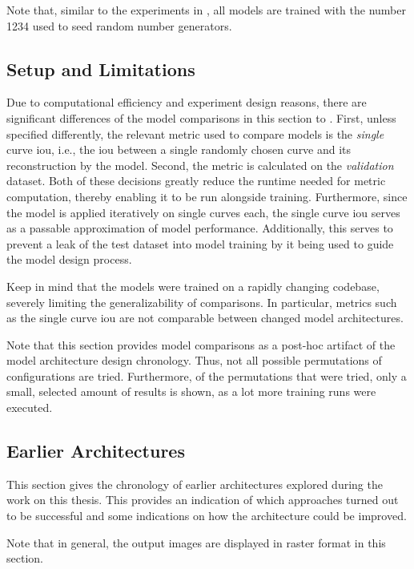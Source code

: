 Note that, similar to the experiments in , all models are trained with the number 1234 used to seed random number generators.

\subsection{Setup and Limitations}
\label{subsec:ablation.limitation}

Due to computational efficiency and experiment design reasons, there are significant differences of the model comparisons in this section to . First, unless specified differently, the relevant metric used to compare models is the \emph{single} curve \gls{iou}, i.e., the \gls{iou} between a single randomly chosen curve and its reconstruction by the model. Second, the metric is calculated on the \textit{validation} dataset. Both of these decisions greatly reduce the runtime needed for metric computation, thereby enabling it to be run alongside training. Furthermore, since the model is applied iteratively on single curves each, the single curve \gls{iou} serves as a passable approximation of model performance. Additionally, this serves to prevent a leak of the test dataset into model training by it being used to guide the model design process.

Keep in mind that the models were trained on a rapidly changing codebase, severely limiting the generalizability of comparisons. In particular, metrics such as the single curve \gls{iou} are not comparable between changed model architectures.

Note that this section provides model comparisons as a post-hoc artifact of the model architecture design chronology. Thus, not all possible permutations of configurations are tried. Furthermore, of the permutations that were tried, only a small, selected amount of results is shown, as a lot more training runs were executed.

\subsection{Earlier Architectures}
\label{subsec:early}
This section gives the chronology of earlier architectures explored during the work on this thesis. This provides an indication of which approaches turned out to be successful and some indications on how the architecture could be improved.

Note that in general, the output images are displayed in raster format in this section.

